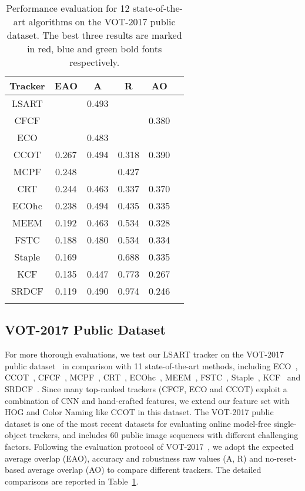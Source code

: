 \documentclass[10pt,twocolumn,letterpaper]{article}
\begin{document}
\begin{table}[hht]
\caption{Performance evaluation for 12 state-of-the-art algorithms on the VOT-2017 public dataset.
The best three results are marked in red, blue and green bold fonts respectively.}
\label{tab:table1}
\small
\begin{center}
\label{tab1}
\begin{tabular}{cccccc}
\hline
Tracker&EAO&A&R&AO
\\
\hline
\hline
LSART&\color{red}{\bf 0.323}&0.493&\color{red}{\bf 0.218}&\color{blue}{\bf 0.437}\\
CFCF&\color{blue}{\bf 0.286}&\color{green}{\bf 0.509}&\color{green}{\bf 0.281}&0.380\\
ECO&\color{green}{\bf 0.280}&0.483&\color{blue}{\bf 0.276}&\color{green}{\bf 0.402}\\
CCOT&0.267&0.494&0.318&0.390\\
MCPF&0.248&\color{blue}{\bf 0.510}&0.427&\color{red}{\bf 0.443}\\
CRT&0.244&0.463&0.337&0.370\\
ECOhc&0.238&0.494&0.435&0.335\\
MEEM&0.192&0.463&0.534&0.328\\
FSTC&0.188&0.480&0.534&0.334\\
Staple&0.169&\color{red}{\bf 0.530}&0.688&0.335\\
KCF&0.135&0.447&0.773&0.267\\
SRDCF&0.119&0.490&0.974&0.246&\\
\hline
\vspace{-4mm}
\label{tab:vot-2017}
\end{tabular}
\end{center}
\end{table}

\vspace{-0mm}
\subsection{VOT-2017 Public Dataset}
For more thorough evaluations, we test our LSART tracker on the VOT-2017 public dataset~\cite{VOT2017}
in comparison with 11 state-of-the-art methods, including ECO~\cite{danelljan2016eco},
CCOT~\cite{danelljan2016beyond}, CFCF~\cite{gundogdu2017good}, MCPF~\cite{zhang2017multi},
CRT~\cite{chen2016convolutional}, ECOhc~\cite{danelljan2016eco}, MEEM~\cite{zhang2014meem},
FSTC~\cite{wang2015visual}, Staple~\cite{bertinetto2016staple}, KCF~\cite{henriques2015high}
and SRDCF~\cite{danelljan2015learning}.
Since many top-ranked trackers (\eg CFCF, ECO and CCOT) exploit a combination of CNN and hand-crafted features,
we extend our feature set with HOG and Color Naming like CCOT in this dataset.
The VOT-2017 public dataset is one of the most recent datasets for evaluating online model-free single-object trackers,
and includes $60$ public image sequences with different challenging factors.
Following the evaluation protocol of VOT-2017~\cite{VOT2017}, we adopt the expected average
overlap (EAO), accuracy and robustness raw values (A, R) and no-reset-based average overlap
(AO) to compare different trackers.
The detailed comparisons are reported in Table~\ref{tab:vot-2017}.
\end{document}
